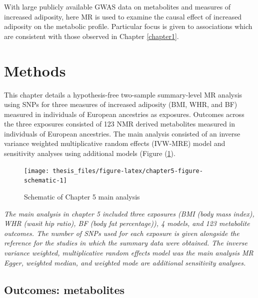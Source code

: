 \documentclass[11pt,twoside]{bristolthesis}
\newcommand{\bsmall}{\begin{small}}
\newcommand{\esmall}{\end{small}}
\begin{document}
With large publicly available GWAS data on metabolites and measures of increased adiposity, here MR is used to examine the causal effect of increased adiposity on the metabolic profile. Particular focus is given to associations which are consistent with those observed in Chapter \ref{chapter1}.

\hypertarget{methods}{%
\section{Methods}\label{methods}}

This chapter details a hypothesis-free two-sample summary-level MR analysis using SNPs for three measures of increased adiposity (BMI, WHR, and BF) measured in individuals of European ancestries as exposures. Outcomes across the three exposures consisted of 123 NMR derived metabolites measured in individuals of European ancestries. The main analysis consisted of an inverse variance weighted multiplicative random effects (IVW-MRE) model and sensitivity analyses using additional models (Figure (\ref{fig:chapter5-figure-schematic}).
\begin{figure}
\texttt{[image: thesis\_files/figure-latex/chapter5-figure-schematic-1]} \caption{Schematic of Chapter 5 main analysis}\label{fig:chapter5-figure-schematic}
\end{figure}
\noindent 
\bsmall
\emph{The main analysis in chapter 5 included three exposures (BMI (body mass index), WHR (wasit hip ratio), BF (body fat percentage)), 4 models, and 123 metabolite outcomes. The number of SNPs used for each exposure is given alongside the reference for the studies in which the summary data were obtained. The inverse variance weighted, multiplicative random effects model was the main analysis MR Egger, weighted median, and weighted mode are additional sensitivity analyses.}
\esmall

\hypertarget{outcomes-metabolites}{%
\subsection{Outcomes: metabolites}\label{outcomes-metabolites}}
\end{document}
